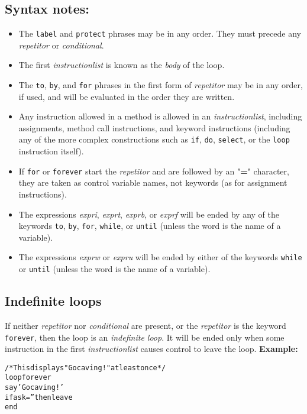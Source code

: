 \subsection{Syntax notes:}
\begin{itemize}
\item 
The \texttt{label} and \texttt{protect} phrases may be in any order.
They must precede any \emph{repetitor} or \emph{conditional}.
\item 
{}
The first \emph{instructionlist} is known as the \emph{body} of
the loop.
\item 
The \texttt{to}, \texttt{by}, and \texttt{for} phrases in the first form
of \emph{repetitor} may be in any order, if used, and will be
evaluated in the order they are written.
\item 
Any instruction allowed in a method is allowed in an
\emph{instructionlist}, including assignments, method call
instructions, and keyword instructions (including any of the more
complex constructions such as \texttt{if}, \texttt{do}, \texttt{select},
or the \texttt{loop} instruction itself).
\item 
If \texttt{for} or \texttt{forever} start the \emph{repetitor} and
are followed by an "\textbf{=}" character, they are taken as
control variable names, not keywords (as for assignment instructions).
\item 
The expressions \emph{expri}, \emph{exprt}, \emph{exprb}, or
\emph{exprf} will be ended by any of the keywords \texttt{to},
\texttt{by}, \texttt{for}, \texttt{while}, or \texttt{until} (unless
the word is the name of a variable).
\item 
The expressions \emph{exprw} or \emph{expru} will be ended by
either of the keywords \texttt{while} or \texttt{until} (unless the
word is the name of a variable).
\end{itemize}
\subsection{Indefinite loops}
 If neither \emph{repetitor} nor \emph{conditional} are
present, or the \emph{repetitor} is the keyword \texttt{forever},
then the loop is an \emph{indefinite loop}.
It will be ended only when some instruction in the first
\emph{instructionlist} causes control to leave the loop.
 \textbf{Example:}
\begin{alltt}
/* This displays "Go caving!" at least once */
loop forever
  say 'Go caving!'
  if ask='' then leave
  end
\end{alltt}
